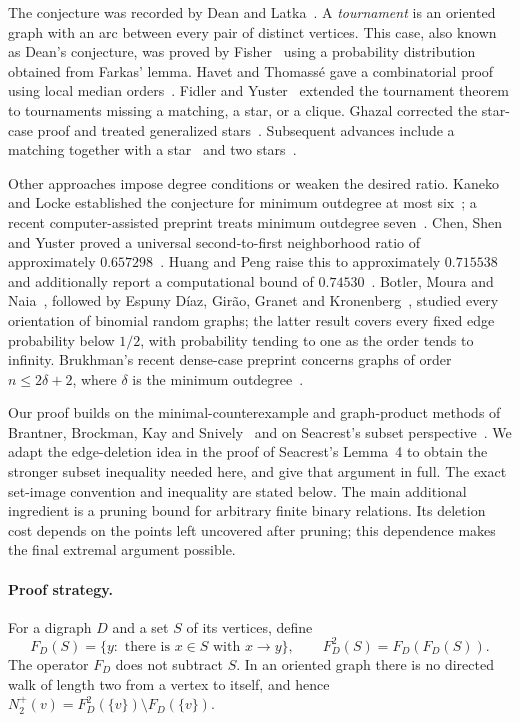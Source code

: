 \documentclass[11pt]{article}
\theoremstyle{remark}
\begin{document}
The conjecture was recorded by Dean and Latka~\cite{DeanLatka1995}.
A \emph{tournament} is an oriented graph with an arc between every pair of
distinct vertices.  This case, also known as Dean's conjecture, was proved
by Fisher~\cite{Fisher1996} using a probability distribution obtained from
Farkas' lemma.  Havet and Thomass\'e gave a combinatorial proof using
local median orders~\cite{HavetThomasse2000}.  Fidler and
Yuster~\cite{FidlerYuster2007} extended the tournament theorem to
tournaments missing a matching, a star, or a clique.  Ghazal corrected the
star-case proof and treated generalized stars~\cite{Ghazal2012}.
Subsequent advances include a matching together with a
star~\cite{DaraFrancisJacobNarayanan2022} and two
stars~\cite{DaamouchAlMninyGhazal2025}.

Other approaches impose degree conditions or weaken the desired ratio.
Kaneko and Locke established the conjecture for minimum outdegree at most
six~\cite{KanekoLocke2001}; a recent computer-assisted preprint treats
minimum outdegree seven~\cite{SadhukhanSandeepSen2026}.
Chen, Shen and Yuster proved a universal second-to-first neighborhood
ratio of approximately $0.657298$~\cite{ChenShenYuster2003}.
Huang and Peng raise this to approximately $0.715538$ and additionally
report a computational bound of $0.74530$~\cite{HuangPeng2024}.
Botler, Moura and Naia~\cite{BotlerMouraNaia2023}, followed by
Espuny D\'iaz, Gir\~ao, Granet and Kronenberg~\cite{EspunyDiazEtAl2025},
studied every orientation of binomial random graphs; the latter result
covers every fixed edge probability below $1/2$, with probability tending
to one as the order tends to infinity.  Brukhman's recent dense-case
preprint concerns graphs of order $n\leq 2\delta+2$, where $\delta$ is
the minimum outdegree~\cite{Brukhman2026}.

Our proof builds on the minimal-counterexample and graph-product
methods of Brantner, Brockman, Kay and
Snively~\cite{BrantnerBrockmanKaySnively2009} and on Seacrest's
subset perspective~\cite{Seacrest2019}.
We adapt the edge-deletion idea in the proof of Seacrest's Lemma~4 to
obtain the stronger subset inequality needed here, and give that argument
in full.  The exact set-image convention and inequality are stated below.
The main additional ingredient is a pruning bound for arbitrary finite
binary relations.  Its deletion cost depends on the points left uncovered
after pruning; this dependence makes the final extremal argument possible.

\paragraph{Proof strategy.}
For a digraph \(D\) and a set \(S\) of its vertices, define
\[
 F_D(S)=\{y:\text{ there is }x\in S\text{ with }x\to y\},
 \qquad F_D^2(S)=F_D(F_D(S)).
\]
The operator \(F_D\) does not subtract \(S\).  In an oriented graph there is
no directed walk of length two from a vertex to itself, and hence
\(N_2^+(v)=F_D^2(\{v\})\setminus F_D(\{v\})\).
\end{document}
